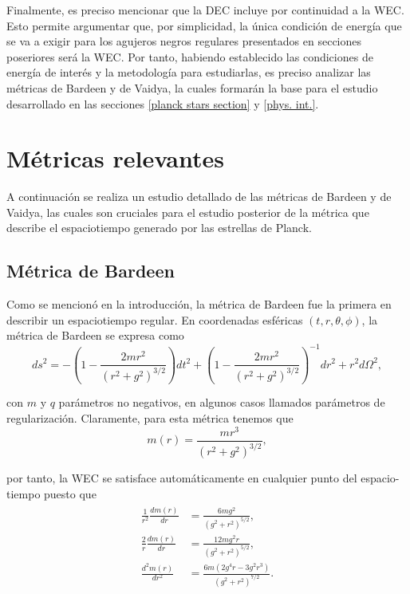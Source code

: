 \documentclass[16pt,a4paper]{article}
\numberwithin{equation}{section}
\theoremstyle{definition}
\begin{document}
Finalmente, es preciso mencionar que la DEC incluye por continuidad a la WEC. Esto permite argumentar que, por simplicidad, la única condición de energía que se va a exigir para los agujeros negros regulares presentados en secciones poseriores será la WEC. Por tanto, habiendo establecido las condiciones de energía de interés y la metodología para estudiarlas, es preciso analizar las métricas de Bardeen y de Vaidya, la cuales formarán la base para el estudio desarrollado en las secciones \ref{planck stars section} y \ref{phys. int.}.

\newpage
\section{\label{previous metrics section} Métricas relevantes}

A continuación se realiza un estudio detallado de las métricas de Bardeen y de Vaidya, las cuales son cruciales para el estudio posterior de la métrica que describe el espaciotiempo generado por las estrellas de Planck.

\subsection{\label{bardeen section} Métrica de Bardeen}

Como se mencionó en la introducción, la métrica de Bardeen \cite{bardeen} fue la primera en describir un espaciotiempo regular. En coordenadas esféricas $(t,r,\theta,\phi)$, la métrica de Bardeen se expresa como
\begin{equation}
\label{bardeen metric}
ds^2 = -\left( 1 - \frac{2mr^2}{(r^2 + g^2)^{3/2}} \right)dt^2 + \left( 1 - \frac{2mr^2}{(r^2 + g^2)^{3/2}} \right)^{-1}dr^2 + r^2d\Omega^2,
\end{equation}

con $m$ y $q$ parámetros no negativos, en algunos casos llamados parámetros de regularización. Claramente, para esta métrica tenemos que 
\begin{equation}
m(r) = \frac{mr^3}{(r^2 + g^2)^{3/2}},
\end{equation}

por tanto, la WEC se satisface automáticamente en cualquier punto del espacio-tiempo puesto que 
\begin{align}
\begin{aligned}
\frac{1}{r^2}\frac{dm(r)}{dr} &= \frac{6 m g^2}{\left(g^2+r^2\right)^{5/2}},\\
\frac{2}{r}\frac{dm(r)}{dr} &= \frac{12 m g^2 r}{\left(g^2+r^2\right)^{5/2}},\\
\frac{d^2m(r)}{dr^2} &= \frac{6 m \left(2 g^4 r-3 g^2 r^3\right)}{\left(g^2+r^2\right)^{7/2}}.
\end{aligned}
\end{align}
\end{document}
